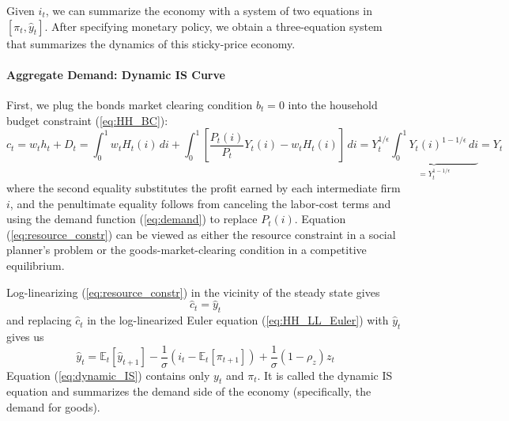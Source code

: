 \documentclass[12pt]{article}
\newcommand{\E}{\mathbb{E}}
\begin{document}
Given $i_t$, we can summarize the economy with a system of two equations in $[\pi_t, \hat{y}_t]$. After specifying monetary policy, we obtain a three-equation system that summarizes the dynamics of this sticky-price economy.

\paragraph{Aggregate Demand: Dynamic IS Curve \\ [6pt]}
First, we plug the bonds market clearing condition $b_t = 0$ into the household budget constraint (\ref{eq:HH_BC}):
\begin{equation} \label{eq:resource_constr}
	c_t = w_t h_t + D_t = \int_0^1 w_t H_t(i) \, di + \int_0^1 \left[\frac{P_t(i)}{P_t} Y_t(i) - w_t H_t(i)\right] \, di = Y_t^{1/\epsilon} \underbrace{\int_0^1 Y_t(i)^{1-1/\epsilon} \, di}_{=Y_t^{1-1/\epsilon}} = Y_t
\end{equation}
where the second equality substitutes the profit earned by each intermediate firm $i$, and the penultimate equality follows from canceling the labor-cost terms and using the demand function (\ref{eq:demand}) to replace $P_t(i)$. Equation (\ref{eq:resource_constr}) can be viewed as either the resource constraint in a social planner's problem or the goods-market-clearing condition in a competitive equilibrium.

Log-linearizing (\ref{eq:resource_constr}) in the vicinity of the steady state gives
\begin{equation}
	\hat{c}_t = \hat{y}_t
\end{equation}
and replacing $\hat{c}_t$ in the log-linearized Euler equation (\ref{eq:HH_LL_Euler}) with $\hat{y}_t$ gives us
\begin{equation} \label{eq:dynamic_IS}
	\hat{y}_t = \E_t [\hat{y}_{t+1}] - \frac{1}{\sigma} (i_t - \E_t[\pi_{t+1}]) + \frac{1}{\sigma} (1-\rho_z) z_t
\end{equation}
Equation (\ref{eq:dynamic_IS}) contains only $y_t$ and $\pi_t$. It is called the dynamic IS equation and summarizes the demand side of the economy (specifically, the demand for goods). 
\end{document}
